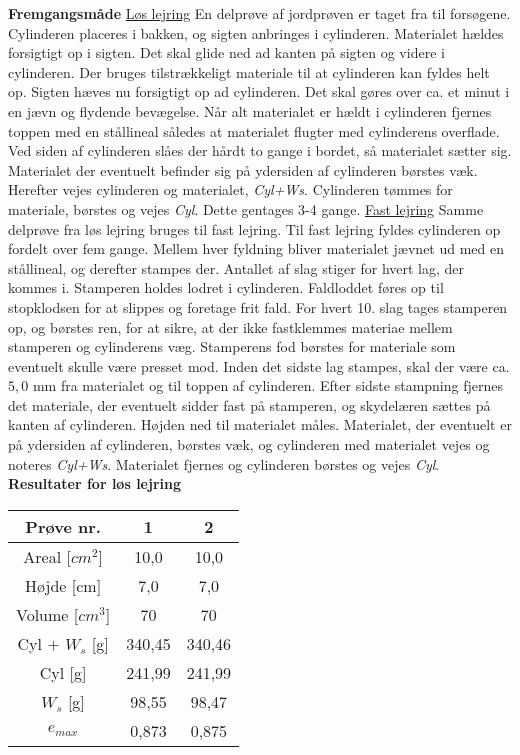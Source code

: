 \textbf{Fremgangsmåde}
\newline
\underline{Løs lejring}
\newline
En delprøve af jordprøven er taget fra til forsøgene. Cylinderen placeres i bakken, og sigten anbringes i cylinderen. Materialet hældes forsigtigt op i sigten. Det skal glide ned ad kanten på sigten og videre i cylinderen. Der bruges tilstrækkeligt materiale til at cylinderen kan fyldes helt op. Sigten hæves nu forsigtigt op ad cylinderen. Det skal gøres over ca. et minut  i en jævn og flydende bevægelse. Når alt materialet er hældt i cylinderen fjernes toppen med en stållineal således at materialet flugter med cylinderens overflade. Ved siden af cylinderen slåes der hårdt to gange i bordet, så materialet sætter sig. Materialet der eventuelt befinder sig på ydersiden af cylinderen børstes væk. Herefter vejes cylinderen og materialet, \textit{Cyl+Ws}. Cylinderen tømmes for materiale, børstes og vejes \textit{Cyl}. Dette gentages 3-4 gange.
\newline
\newline
\underline{Fast lejring}
\newline
Samme delprøve fra løs lejring bruges til fast lejring. Til fast lejring fyldes cylinderen op fordelt over fem gange. Mellem hver fyldning bliver materialet jævnet ud med en stållineal, og derefter stampes der. Antallet af slag stiger for hvert lag, der kommes i. Stamperen holdes lodret i cylinderen. Faldloddet føres op til stopklodsen for at slippes og foretage frit fald. For hvert 10. slag tages stamperen op, og børstes ren, for at sikre, at der ikke fastklemmes materiae mellem stamperen og cylinderens væg. Stamperens fod børstes for materiale som eventuelt skulle være presset mod. Inden det sidste lag stampes, skal der være ca. $5,\!0$ mm fra materialet og til toppen af cylinderen. Efter sidste stampning fjernes det materiale, der eventuelt sidder fast på stamperen, og skydelæren sættes på kanten af cylinderen. Højden ned til materialet måles. Materialet, der eventuelt er på ydersiden af cylinderen, børstes væk, og cylinderen med materialet vejes og noteres \textit{Cyl+Ws}. Materialet fjernes og cylinderen børstes og vejes \textit{Cyl}.
\newline
\newline
\textbf{Resultater for løs lejring}
\begin{center}
	\begin{tabular}{ |c|c|c| } 
		\hline
		Prøve nr. & 1 & 2 \\	\hline 
		Areal [$cm^2$] & 10,0 & 10,0 \\ \hline
		Højde [cm] & 7,0 & 7,0 \\ \hline
		Volume [$cm^3$] & 70 & 70 \\ \hline
		Cyl + $W_s$ [g] & 340,45 & 340,46 \\ \hline
		Cyl [g] & 241,99 & 241,99 \\ \hline
		$W_s$ [g] & 98,55 & 98,47 \\ \hline
		$e_{max}$ & 0,873 & 0,875 \\ \hline
	\end{tabular}
\end{center}

